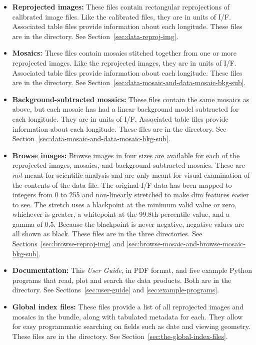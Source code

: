 \begin{itemize}
\item \textbf{Reprojected images:} These files contain rectangular reprojections of calibrated image files. Like the calibrated files, they are in units of I/F. Associated table files provide information about each longitude. These files are in the  directory. See Section~\ref{sec:data-reproj-img}.
\item \textbf{Mosaics:} These files contain mosaics stitched together from one or more reprojected images. Like the reprojected images, they are in units of I/F. Associated table files provide information about each longitude. These files are in the  directory. See Section~\ref{sec:data-mosaic-and-data-mosaic-bkg-sub}.
\item \textbf{Background-subtracted mosaics:} These files contain the same mosaics as above, but each mosaic has had a linear background model subtracted for each longitude. They are in units of I/F. Associated table files provide information about each longitude. These files are in the  directory. See Section~\ref{sec:data-mosaic-and-data-mosaic-bkg-sub}.
\item \textbf{Browse images:} Browse images in four sizes are available for each of the reprojected images, mosaics, and background-subtracted mosaics. These are \textit{not} meant for scientific analysis and are only meant for visual examination of the contents of the data file. The original I/F data has been mapped to integers from 0 to 255 and non-linearly stretched to make dim features easier to see. The stretch uses a blackpoint at the minimum valid value or zero, whichever is greater, a whitepoint at the 99.8th-percentile value, and a gamma of 0.5. Because the blackpoint is never negative, negative values are all shown as black. These files are in the three  directories. See Sections~\ref{sec:browse-reproj-img} and \ref{sec:browse-mosaic-and-browse-mosaic-bkg-sub}.
\item \textbf{Documentation:} This \textit{User Guide}, in PDF format, and five example Python programs that read, plot and search the data products. Both are in the  directory. See Sections~\ref{sec:user-guide} and \ref{sec:example-programs}.
\item \textbf{Global index files:} These files provide a list of all reprojected images and mosaics in the bundle, along with tabulated metadata for each. They allow for easy programmatic searching on fields such as date and viewing geometry. These files are in the  directory. See Section~\ref{sec:the-global-index-files}.

\end{itemize}
